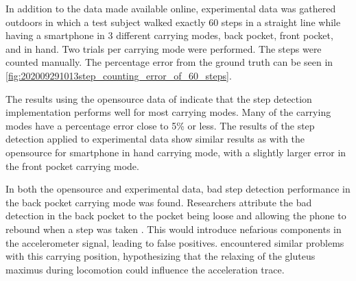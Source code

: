 In addition to the data made available online, experimental data was gathered outdoors in which a test subject walked exactly 60 steps in a straight line while having a smartphone in 3 different carrying modes, back pocket, front pocket, and in hand. Two trials per carrying mode were performed. The steps were counted manually. The percentage error from the ground truth can be seen in \cref{fig:202009291013step_counting_error_of_60_steps}.

The results using the opensource data of \citet{Salvi2018} indicate that the step detection implementation performs well for most carrying modes. Many of the carrying modes have a percentage error close to 5\% or less. The results of the step detection applied to experimental data show similar results as with the opensource for smartphone in hand carrying mode, with a slightly larger error in the front pocket carrying mode.\par 

In both the opensource and experimental data, bad step detection performance in the back pocket carrying mode was found. Researchers attribute the bad detection in the back pocket to the pocket being loose and allowing the phone to rebound when a step was taken \cite{Salvi2018}. This would introduce nefarious components in the accelerometer signal, leading to false positives. \citet{Brajdic2013} encountered similar problems with this carrying position, hypothesizing that the relaxing of the gluteus maximus during locomotion could influence the acceleration trace.

